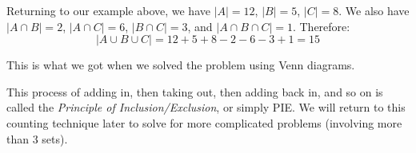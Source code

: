 \documentclass[10pt,]{book}
\theoremstyle{plain}
\theoremstyle{definition}
\theoremstyle{definition}
\theoremstyle{definition}
\theoremstyle{definition}
\numberwithin{equation}{chapter}
\newcommand{\card}[1]{\left| #1 \right|}
\begin{document}
\par
\hypertarget{p-742}{}%
Returning to our example above, we have \(\card{A} = 12\), \(\card{B} = 5\), \(\card{C} = 8\). We also have \(\card{A \cap B} = 2\), \(\card{A \cap C} = 6\), \(\card{B \cap C} = 3\), and \(\card{A \cap B \cap C} = 1\). Therefore:%
\begin{equation*}
\card{A \cup B \cup C} = 12 + 5 + 8 - 2 - 6 - 3 + 1 = 15
\end{equation*}
%
\par
\hypertarget{p-743}{}%
This is what we got when we solved the problem using Venn diagrams.%
\par
\hypertarget{p-744}{}%
This process of adding in, then taking out, then adding back in, and so on is called the \emph{Principle of Inclusion/Exclusion}, or simply PIE. We will return to this counting technique later to solve for more complicated problems (involving more than 3 sets).%
\typeout{************************************************}
\typeout{************************************************}
\end{document}
